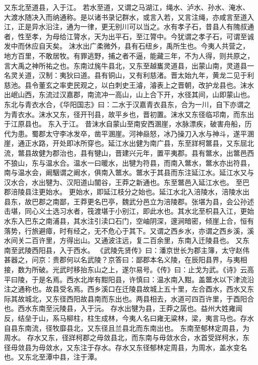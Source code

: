 \documentclass[12pt,UTF8]{ctexbook}
\begin{document}
又东北至道县，入于江。
若水至道，又谓之马湖江，绳水、泸水、孙水、淹水、大渡水随决入而纳通称。是以诸书录记群水，或言入若，又言注绳，亦咸言至道入江，正是异水沿注，通为一律，更无别川可以当之。水有孝子石，昔县人有隗叔通者，性至孝，为母给江膂水，天为出平石，至江膂中。今犹谓之孝子石，可谓至诚发中而休应自天矣。
沫水出广柔微外，县有石纽乡，禹所生也。今夷人共营之，地方百里，不敢居牧。有罪逃野，捕之者不逼，能藏三年，不为人得，则共原之，言大禹之神所祐之也。东南过旄牛县北，又东至越巂灵道县，出蒙山南，灵道县一名灵关道，汉制：夷狄曰道。县有铜山，又有利慈渚。晋太始九年，黄龙二见于利慈池。县令董玄之率吏民观之，以白刺史王濬，濬表上之晋朝，改护龙县也。沫水出岷山西，东流过汉嘉郡，南流冲一高山，山上合下开，水径其间，山即蒙山也。
东北与青衣水合，《华阳国志》曰：二水于汉嘉青衣县东，合为一川，自下亦谓之为青衣水。沫水又东，径开刊县，故平乡也，晋初置。沫水又东径临邛南，而东出于江原县也。
东入于江。
昔沫水自蒙山至南安西溷崖，水脉漂疾，破害舟船，历代为患。蜀郡太守李冰发卒，凿平溷崖。河神赑怒，冰乃操刀入水与神斗，遂平溷崖，通正水路，开处即冰所穿也。延江水出健为南广县，东至牂柯鄨县，又东屈北流，鄨县故健为郡治也，县有犍山，晋建兴元年，置平夷郡。县有鄨水，出鄨邑西不狼山，东与温水合。温水一曰暖水，出犍为符县，而南入鄨水，鄨水亦出符县，南与温水会，阚駰谓之阚水，俱南入鄨水。鄨水于其县而东注延江水。延江水又与汉水合，水出犍为、汉阳道山闟谷，王莽之新通也。东至鄨邑入延江水也。
至巴郡涪陵县注更始水。
更始水，即延江枝分之始也。延江水北入涪陵水，涪陵水出县东，故巴郡之南鄙，王莽更名巴亭，魏武分邑立为涪陵郡。张堪为县，会公孙述击堪，同心义士选习水者，筏渡堪于小别江，即此水也。其水北至枳县入江，更始水东入巴东之南浦县，其水注引渎口石门，空岫阴深，邃涧暗密，倾崖上合，恒有落势，行旅避瘴，时有经之，无不危心于其下。又谓之西乡水，亦谓之西乡溪，溪水间关二百许里，方得出山。又通波注远，复二百余里，东南入迁陵县也。
又东南至武陵西阳县，入于西水。
《武陵先贤传》曰：潘京世长为郡主簿，太守赵伟甚器之，问京：贵郡何以名武陵？京答曰：鄙郡本名义陵，在辰阳县界，与夷相接，数为所破。光武时移抬东山之上，遂尔易号。《传》曰：止戈为武。《诗》云高平曰陵，于是名焉。西水北岸有黚阳县，许慎曰：温水南入黚。盖鄨水以下津流沿注之通称也。故县受名焉。西乡溪口在迁陵县故城上五十里，左合酉水，西水又东际其故城北，又东径西阳故县南而东出也。两县相去，水道可四百许里，于酉阳合也。西水东南至沅陵县，入于沅。
存水出犍为县，王莽之孱也。益州大姓雍闿反，结垒于山，系马柳柱，柱生成林，今夷人名曰雍无粱林，梁，夷言马也。存水自县东南流，径牧靡县北，又东径且兰县北而东南出也。
东南至郁林定周县，为周水。
存水又东，径牂柯郡之毋敛县北，而东南与毋敛水合，水首受牂柯水，东径毋敛县为毋敛水，又东注于存水。存水又东径郁林定周县，为周水，盖水变名也。又东北至潭中县，注于潭。
\end{document}
